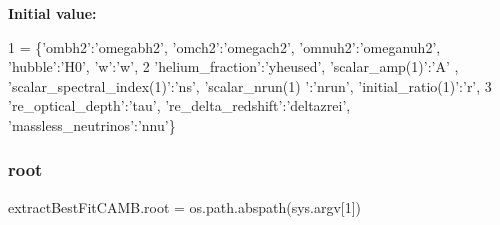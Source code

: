 {\bfseries Initial value\+:}
\begin{DoxyCode}
1 =  \{\textcolor{stringliteral}{'ombh2'}:\textcolor{stringliteral}{'omegabh2'}, \textcolor{stringliteral}{'omch2'}:\textcolor{stringliteral}{'omegach2'}, \textcolor{stringliteral}{'omnuh2'}:\textcolor{stringliteral}{'omeganuh2'}, \textcolor{stringliteral}{'hubble'}:\textcolor{stringliteral}{'H0'}, \textcolor{stringliteral}{'w'}:\textcolor{stringliteral}{'w'},
2         \textcolor{stringliteral}{'helium\_fraction'}:\textcolor{stringliteral}{'yheused'}, \textcolor{stringliteral}{'scalar\_amp(1)'}:\textcolor{stringliteral}{'A'} , \textcolor{stringliteral}{'scalar\_spectral\_index(1)'}:\textcolor{stringliteral}{'ns'}, \textcolor{stringliteral}{'scalar\_nrun(1)
      '}:\textcolor{stringliteral}{'nrun'}, \textcolor{stringliteral}{'initial\_ratio(1)'}:\textcolor{stringliteral}{'r',}
3 \textcolor{stringliteral}{        're\_optical\_depth'}:\textcolor{stringliteral}{'tau'}, \textcolor{stringliteral}{'re\_delta\_redshift'}:\textcolor{stringliteral}{'deltazrei'}, \textcolor{stringliteral}{'massless\_neutrinos'}:\textcolor{stringliteral}{'nnu'}\}
\end{DoxyCode}
\mbox{\label{namespaceextractBestFitCAMB_a92ac932489427bc065e81b7429fcc584}} 
\subsubsection{\texorpdfstring{root}{root}}
{\footnotesize\ttfamily extract\+Best\+Fit\+C\+A\+M\+B.\+root = os.\+path.\+abspath(sys.\+argv\mbox{[}1\mbox{]})}

